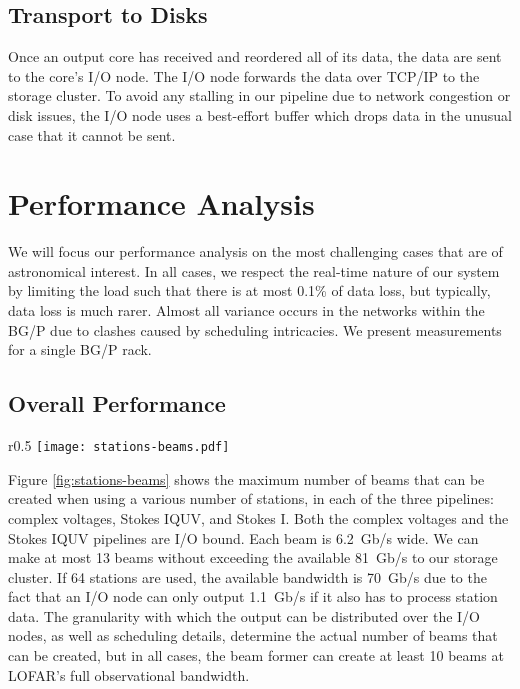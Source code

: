 \documentclass{llncs}
\begin{document}
\subsection{Transport to Disks}
Once an output core has received and reordered all of its data, the data are sent to the core's I/O node. The I/O node forwards the data over TCP/IP to the storage cluster. To avoid any stalling in our pipeline due to network congestion or disk issues, the I/O node uses a best-effort buffer which drops data in the unusual case that it cannot be sent.

\section{Performance Analysis}
\label{Sec:performance}

We will focus our performance analysis on the most challenging cases that are of astronomical interest. In all cases, we respect the real-time nature of our system by limiting the load such that there is at most 0.1\% of data loss, but typically, data loss is much rarer. Almost all variance occurs in the networks within the BG/P due to clashes caused by scheduling intricacies. We present measurements for a single BG/P rack.

\subsection{Overall Performance}

\begin{wrapfigure}{r}{0.5\textwidth}
\vspace{-1.65cm}
\texttt{[image: stations-beams.pdf]}
\caption{The maximum number of beams that can be created in various configurations.}
\label{fig:stations-beams}
\vspace{-1cm}
\end{wrapfigure}

Figure \ref{fig:stations-beams} shows the maximum number of beams that can be created when using a various number of stations, in each of the three pipelines: complex voltages, Stokes IQUV, and Stokes I. Both the complex voltages and the Stokes IQUV pipelines are I/O bound. Each beam is 6.2~Gb/s wide. We can make at most 13 beams without exceeding the available 81~Gb/s to our storage cluster. If 64 stations are used, the available bandwidth is 70~Gb/s due to the fact that an I/O node can only output 1.1~Gb/s if it also has to process station data. The granularity with which the output can be distributed over the I/O nodes, as well as scheduling details, determine the actual number of beams that can be created, but in all cases, the beam former can create at least 10 beams at LOFAR's full observational bandwidth.
\end{document}
